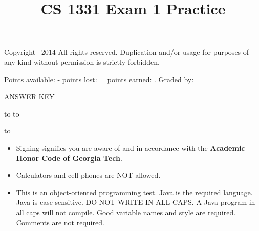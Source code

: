 \documentclass[addpoints,9pt]{exam}
\title{CS 1331 Exam 1 Practice}
\date{}
\begin{document}
\maketitle
\thispagestyle{head}


\runningheader{}
              {\tiny Copyright \textcopyright\ 2014 All rights reserved. Duplication and/or usage for purposes of any kind without permission is strictly forbidden.}
              {}

              {}
              {Points available: \pointsonpage{\thepage} -
               points lost: \makebox[.5in]{\hrulefill} =
               points earned:  \makebox[.5in]{\hrulefill}.
              Graded by: \makebox[.5in]{\hrulefill}}


\ifprintanswers
\begin{center}
{\LARGE ANSWER KEY}
\end{center}
\else
\vspace{0.1in}
\hbox to \textwidth{Name (print clearly): \enspace\hrulefill}
\vspace{0.3in}
\hbox to \textwidth{Signature: \hrulefill}

\vspace{0.3in}
\hbox to \textwidth{GT account username (gtg, gth, msmith3, etc): \enspace\hrulefill}

\fi

\vfill

\begin{itemize}
\item Signing signifies you are aware of and in accordance with the {\bf Academic Honor Code of Georgia Tech}.
\item Calculators and cell phones are NOT allowed.
\item This is an object-oriented programming test.  Java is the required language.  Java is case-sensitive.  DO NOT WRITE IN ALL CAPS.  A Java program in all caps will not compile.  Good variable names and style are required.  Comments are not required.
\end{itemize}

\vfill

\addpoints
\end{document}
